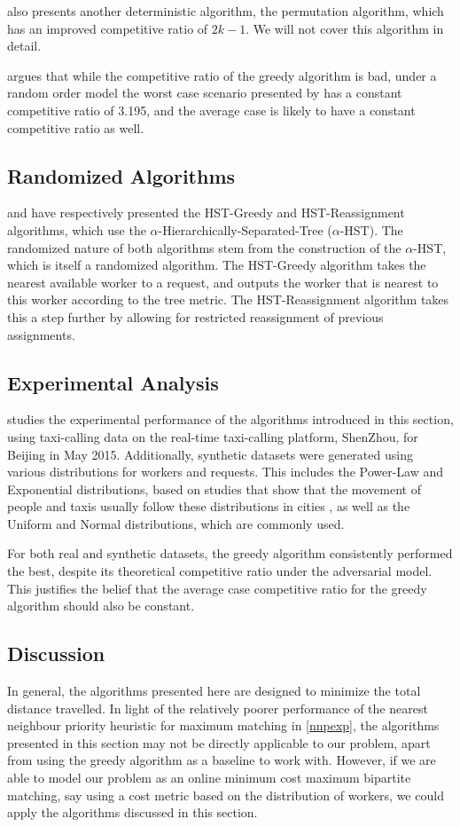 \documentclass[urop]{socreport}
\begin{document}
\cite{greedy} also presents another deterministic algorithm, the permutation algorithm, which has an improved competitive ratio of $2k -1$. We will not cover this algorithm in detail.

\cite{tong} argues that while the competitive ratio of the greedy algorithm is bad, under a random order model the worst case scenario presented by \cite{greedy} has a constant competitive ratio of 3.195, and the average case is likely to have a constant competitive ratio as well.

\subsection{Randomized Algorithms}
\cite{hst-g} and \cite{hst-re} have respectively presented the HST-Greedy and HST-Reassignment algorithms, which use the $\alpha$-Hierarchically-Separated-Tree ($\alpha$-HST). The randomized nature of both algorithms stem from the construction of the $\alpha$-HST, which is itself a randomized algorithm. The HST-Greedy algorithm takes the nearest available worker to a request, and outputs the worker that is nearest to this worker according to the tree metric. The HST-Reassignment algorithm takes this a step further by allowing for restricted reassignment of previous assignments.

\subsection{Experimental Analysis}
\cite{tong} studies the experimental performance of the algorithms introduced in this section, using taxi-calling data on the real-time taxi-calling platform, ShenZhou, for Beijing in May 2015. Additionally, synthetic datasets were generated using various distributions for workers and requests. This includes the Power-Law and Exponential distributions, based on studies that show that the movement of people and taxis usually follow these distributions in cities \cite{dist1,dist2}, as well as the Uniform and Normal distributions, which are commonly used.

For both real and synthetic datasets, the greedy algorithm consistently performed the best, despite its theoretical competitive ratio under the adversarial model. This justifies the belief that the average case competitive ratio for the greedy algorithm should also be constant.

\subsection{Discussion}
In general, the algorithms presented here are designed to minimize the total distance travelled. In light of the relatively poorer performance of the nearest neighbour priority heuristic for maximum matching in \ref{nnpexp}, the algorithms presented in this section may not be directly applicable to our problem, apart from using the greedy algorithm as a baseline to work with. However, if we are able to model our problem as an online minimum cost maximum bipartite matching, say using a cost metric based on the distribution of workers, we could apply the algorithms discussed in this section.
\end{document}
